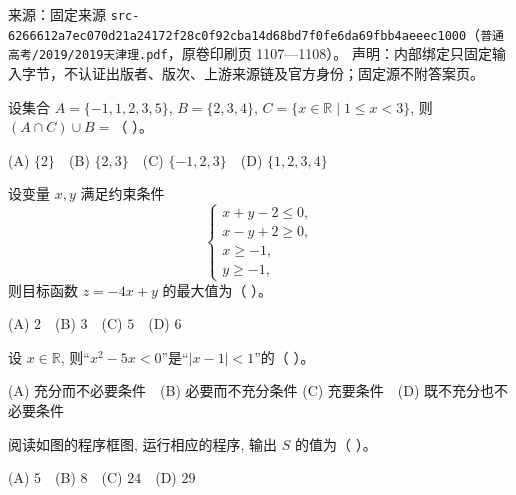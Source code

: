 
\begin{gktip}
来源：固定来源 \texttt{src-6266612a7ec070d21a24172f28c0f92cba14d68bd7f0fe6da69fbb4aeeec1000}（\texttt{普通高考/2019/2019天津理.pdf}，原卷印刷页 1107—1108）。
声明：内部绑定只固定输入字节，不认证出版者、版次、上游来源链及官方身份；固定源不附答案页。
\end{gktip}

\par\medskip


\begin{question}
设集合 $A = \{-1, 1, 2, 3, 5\}$, $B = \{2, 3, 4\}$, $C = \{x \in \mathbb{R} \mid 1 \leqslant x < 3\}$, 则 $(A \cap C) \cup B =$（ ）。

(A) $\{2\}$　(B) $\{2, 3\}$　(C) $\{-1, 2, 3\}$　(D) $\{1, 2, 3, 4\}$

\end{question}
\begin{question}
设变量 $x, y$ 满足约束条件
\nopagebreak[4]
\[
\begin{cases}
x + y - 2 \leqslant 0, \\
x - y + 2 \geqslant 0, \\
x \geqslant -1, \\
y \geqslant -1,
\end{cases}
\]
则目标函数 $z = -4x + y$ 的最大值为（ ）。

(A) $2$　(B) $3$　(C) $5$　(D) $6$

\end{question}
\begin{question}
设 $x \in \mathbb{R}$, 则“$x^2 - 5x < 0$”是“$|x - 1| < 1$”的（ ）。

(A) 充分而不必要条件　(B) 必要而不充分条件  
(C) 充要条件　(D) 既不充分也不必要条件

\Needspace{0.4\textheight}
\end{question}
\begin{question}
阅读如图的程序框图, 运行相应的程序, 输出 $S$ 的值为（ ）。
\nopagebreak[4]
\begin{center}\end{center}
\nopagebreak[4]
(A) $5$　(B) $8$　(C) $24$　(D) $29$

\end{question}
